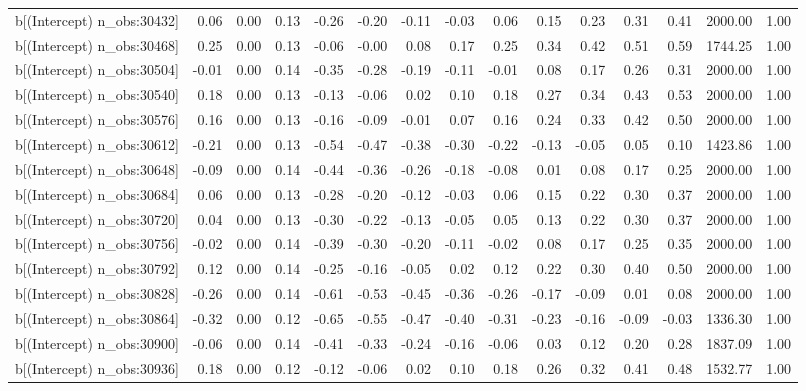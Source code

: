 \begin{table}[ht]
\begin{tabular}{rrrrrrrrrrrrrrr}
  b[(Intercept) n\_obs:30432] & 0.06 & 0.00 & 0.13 & -0.26 & -0.20 & -0.11 & -0.03 & 0.06 & 0.15 & 0.23 & 0.31 & 0.41 & 2000.00 & 1.00 \\ 
  b[(Intercept) n\_obs:30468] & 0.25 & 0.00 & 0.13 & -0.06 & -0.00 & 0.08 & 0.17 & 0.25 & 0.34 & 0.42 & 0.51 & 0.59 & 1744.25 & 1.00 \\ 
  b[(Intercept) n\_obs:30504] & -0.01 & 0.00 & 0.14 & -0.35 & -0.28 & -0.19 & -0.11 & -0.01 & 0.08 & 0.17 & 0.26 & 0.31 & 2000.00 & 1.00 \\ 
  b[(Intercept) n\_obs:30540] & 0.18 & 0.00 & 0.13 & -0.13 & -0.06 & 0.02 & 0.10 & 0.18 & 0.27 & 0.34 & 0.43 & 0.53 & 2000.00 & 1.00 \\ 
  b[(Intercept) n\_obs:30576] & 0.16 & 0.00 & 0.13 & -0.16 & -0.09 & -0.01 & 0.07 & 0.16 & 0.24 & 0.33 & 0.42 & 0.50 & 2000.00 & 1.00 \\ 
  b[(Intercept) n\_obs:30612] & -0.21 & 0.00 & 0.13 & -0.54 & -0.47 & -0.38 & -0.30 & -0.22 & -0.13 & -0.05 & 0.05 & 0.10 & 1423.86 & 1.00 \\ 
  b[(Intercept) n\_obs:30648] & -0.09 & 0.00 & 0.14 & -0.44 & -0.36 & -0.26 & -0.18 & -0.08 & 0.01 & 0.08 & 0.17 & 0.25 & 2000.00 & 1.00 \\ 
  b[(Intercept) n\_obs:30684] & 0.06 & 0.00 & 0.13 & -0.28 & -0.20 & -0.12 & -0.03 & 0.06 & 0.15 & 0.22 & 0.30 & 0.37 & 2000.00 & 1.00 \\ 
  b[(Intercept) n\_obs:30720] & 0.04 & 0.00 & 0.13 & -0.30 & -0.22 & -0.13 & -0.05 & 0.05 & 0.13 & 0.22 & 0.30 & 0.37 & 2000.00 & 1.00 \\ 
  b[(Intercept) n\_obs:30756] & -0.02 & 0.00 & 0.14 & -0.39 & -0.30 & -0.20 & -0.11 & -0.02 & 0.08 & 0.17 & 0.25 & 0.35 & 2000.00 & 1.00 \\ 
  b[(Intercept) n\_obs:30792] & 0.12 & 0.00 & 0.14 & -0.25 & -0.16 & -0.05 & 0.02 & 0.12 & 0.22 & 0.30 & 0.40 & 0.50 & 2000.00 & 1.00 \\ 
  b[(Intercept) n\_obs:30828] & -0.26 & 0.00 & 0.14 & -0.61 & -0.53 & -0.45 & -0.36 & -0.26 & -0.17 & -0.09 & 0.01 & 0.08 & 2000.00 & 1.00 \\ 
  b[(Intercept) n\_obs:30864] & -0.32 & 0.00 & 0.12 & -0.65 & -0.55 & -0.47 & -0.40 & -0.31 & -0.23 & -0.16 & -0.09 & -0.03 & 1336.30 & 1.00 \\ 
  b[(Intercept) n\_obs:30900] & -0.06 & 0.00 & 0.14 & -0.41 & -0.33 & -0.24 & -0.16 & -0.06 & 0.03 & 0.12 & 0.20 & 0.28 & 1837.09 & 1.00 \\ 
  b[(Intercept) n\_obs:30936] & 0.18 & 0.00 & 0.12 & -0.12 & -0.06 & 0.02 & 0.10 & 0.18 & 0.26 & 0.32 & 0.41 & 0.48 & 1532.77 & 1.00 \\ 

\end{tabular}
\end{table}
